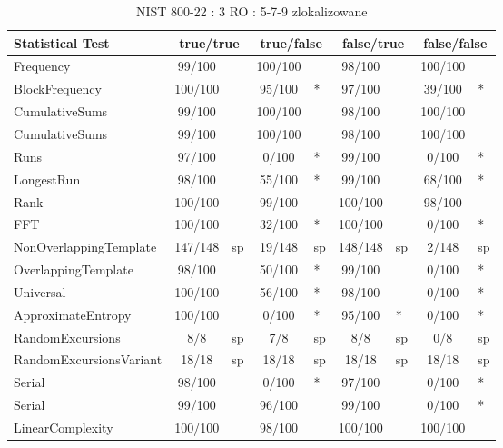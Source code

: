\begin{table}[H]
\centering
\caption{NIST 800-22 : 3 RO : 5-7-9 zlokalizowane}
\label{tab:ch4_nist_22_3RO_21I_LOCALIZED}
\begin{tabular}{|l|c|l|c|l|c|l|c|l|}
\hline
\textbf{Statistical Test} & \multicolumn{2}{c|}{\textbf{true/true}} & \multicolumn{2}{c|}{\textbf{true/false}} & \multicolumn{2}{c|}{\textbf{false/true}} & \multicolumn{2}{c|}{\textbf{false/false}} \\ \hline
Frequency               &  99/100 &     & 100/100 &     &  98/100 &     & 100/100 &     \\ \hline
BlockFrequency          & 100/100 &     &  95/100 & *   &  97/100 &     &  39/100 & *   \\ \hline
CumulativeSums          &  99/100 &     & 100/100 &     &  98/100 &     & 100/100 &     \\ \hline
CumulativeSums          &  99/100 &     & 100/100 &     &  98/100 &     & 100/100 &     \\ \hline
Runs                    &  97/100 &     &   0/100 & *   &  99/100 &     &   0/100 & *   \\ \hline
LongestRun              &  98/100 &     &  55/100 & *   &  99/100 &     &  68/100 & *   \\ \hline
Rank                    & 100/100 &     &  99/100 &     & 100/100 &     &  98/100 &     \\ \hline
FFT                     & 100/100 &     &  32/100 & *   & 100/100 &     &   0/100 & *   \\ \hline
NonOverlappingTemplate  & 147/148 & sp  &  19/148 & sp  & 148/148 & sp  &   2/148 & sp  \\ \hline
OverlappingTemplate     &  98/100 &     &  50/100 & *   &  99/100 &     &   0/100 & *   \\ \hline
Universal               & 100/100 &     &  56/100 & *   &  98/100 &     &   0/100 & *   \\ \hline
ApproximateEntropy      & 100/100 &     &   0/100 & *   &  95/100 & *   &   0/100 & *   \\ \hline
RandomExcursions        &     8/8 & sp  &     7/8 & sp  &     8/8 & sp  &     0/8 & sp  \\ \hline
RandomExcursionsVariant &   18/18 & sp  &   18/18 & sp  &   18/18 & sp  &   18/18 & sp  \\ \hline
Serial                  &  98/100 &     &   0/100 & *   &  97/100 &     &   0/100 & *   \\ \hline
Serial                  &  99/100 &     &  96/100 &     &  99/100 &     &   0/100 & *   \\ \hline
LinearComplexity        & 100/100 &     &  98/100 &     & 100/100 &     & 100/100 &     \\ \hline
\end{tabular}
\end{table}



